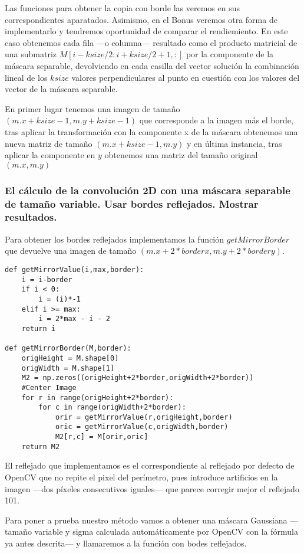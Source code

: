 \documentclass{article}
\begin{document}
Las funciones para obtener la copia con borde las veremos en sus correspondientes aparatados. Asimismo, en el Bonus veremos otra forma de implementarlo y tendremos oportunidad de comparar el rendiemiento. En este caso obtenemos cada fila ---o columna--- resultado como el producto matricial de una submatriz $M[i-ksize/2:i+ksize/2+1,:]$ por la componente de la máscara separable, devolviendo en cada casilla del vector solución la combinación lineal de los $ksize$ valores perpendiculares al punto en cuestión con los valores del vector de la máscara separable.

En primer lugar tenemos una imagen de tamaño $(m.x+ksize-1,m.y+ksize-1)$ que corresponde a la imagen más el borde, tras aplicar la transformación con la componente x de la máscara obtenemos una nueva matriz de tamaño $(m.x+ksize-1,m.y)$ y en última instancia, tras aplicar la componente en $y$ obtenemos una matriz del tamaño original $(m.x,m.y)$

\subsubsection{El cálculo de la convolución 2D con una máscara separable de tamaño variable. Usar bordes reflejados. Mostrar resultados.}

Para obtener los bordes reflejados implementamos la función $getMirrorBorder$ que devuelve una imagen de tamaño $(m.x + 2*borderx, m.y + 2*bordery)$.

\begin{lstlisting}
def getMirrorValue(i,max,border):
    i = i-border
    if i < 0:
        i = (i)*-1
    elif i >= max:
        i = 2*max - i - 2
    return i

def getMirrorBorder(M,border):
    origHeight = M.shape[0]
    origWidth = M.shape[1]
    M2 = np.zeros((origHeight+2*border,origWidth+2*border))
    #Center Image
    for r in range(origHeight+2*border):
        for c in range(origWidth+2*border):
            orir = getMirrorValue(r,origHeight,border)
            oric = getMirrorValue(c,origWidth,border)
            M2[r,c] = M[orir,oric]
    return M2
\end{lstlisting}

El reflejado que implementamos es el correspondiente al reflejado por defecto de OpenCV que no repite el pixel del perímetro, pues introduce artificios en la imagen ---dos píxeles consecutivos iguales--- que parece corregir mejor el reflejado 101.

Para poner a prueba nuestro método vamos a obtener una máscara Gaussiana ---tamaño variable y sigma calculada automáticamente por OpenCV con la fórmula ya antes descrita--- y llamaremos a la función con bodes reflejados.
\end{document}
